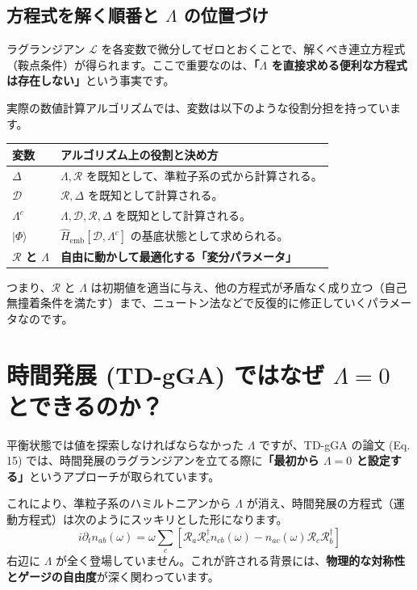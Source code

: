 \documentclass[12pt,a4paper]{ltjsarticle}
\begin{document}
\subsection{方程式を解く順番と $\Lambda$ の位置づけ}

ラグランジアン $\mathcal{L}$ を各変数で微分してゼロとおくことで、解くべき連立方程式（鞍点条件）が得られます。ここで重要なのは、\textbf{「$\Lambda$ を直接求める便利な方程式は存在しない」}という事実です。

実際の数値計算アルゴリズムでは、変数は以下のような役割分担を持っています。

\begin{table}[h]
\centering
\begin{tabular}{ll}
\toprule
変数 & アルゴリズム上の役割と決め方 \\
\midrule
$\Delta$ & $\Lambda, \mathcal{R}$ を既知として、準粒子系の式から計算される。 \\
$\mathcal{D}$ & $\mathcal{R}, \Delta$ を既知として計算される。 \\
$\Lambda^c$ & $\Lambda, \mathcal{D}, \mathcal{R}, \Delta$ を既知として計算される。 \\
$|\Phi\rangle$ & $\hat{H}_\mathrm{emb}[\mathcal{D},\Lambda^c]$ の基底状態として求められる。 \\
\midrule
\textbf{$\mathcal{R}$ と $\Lambda$} & \textbf{自由に動かして最適化する「変分パラメータ」} \\
\bottomrule
\end{tabular}
\end{table}

つまり、$\mathcal{R}$ と $\Lambda$ は初期値を適当に与え、他の方程式が矛盾なく成り立つ（自己無撞着条件を満たす）まで、ニュートン法などで反復的に修正していくパラメータなのです。

\section{時間発展 (TD-gGA) ではなぜ $\Lambda = 0$ とできるのか？}

平衡状態では値を探索しなければならなかった $\Lambda$ ですが、TD-gGA の論文 (Eq. 15) では、時間発展のラグランジアンを立てる際に\textbf{「最初から $\Lambda = 0$ と設定する」}というアプローチが取られています。

これにより、準粒子系のハミルトニアンから $\Lambda$ が消え、時間発展の方程式（運動方程式）は次のようにスッキリとした形になります。
\begin{equation}
  i\partial_t n_{ab}(\omega)
  = \omega\sum_c
    \left[ \mathcal{R}_a\mathcal{R}_c^\dagger n_{cb}(\omega)
   - n_{ac}(\omega)\mathcal{R}_c\mathcal{R}_b^\dagger \right]
\end{equation}
右辺に $\Lambda$ が全く登場していません。これが許される背景には、\textbf{物理的な対称性とゲージの自由度}が深く関わっています。
\end{document}
